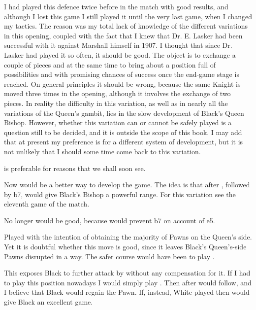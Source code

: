 \documentclass[10pt,twoside]{article}
\begin{document}
I had played this defence twice before in the match with good results, and although I lost this game I still played it until the very last game, when I changed my tactics. The reason was my total lack of knowledge of the different variations in this opening, coupled with the fact that I knew that Dr. E. Lasker had been successful with it against Marshall himself in 1907. I thought that since Dr. Lasker had played it so often, it should be good. The object is to exchange a couple of pieces and at the same time to bring about a position full of possibilities and with promising chances of success once the end-game stage is reached. On general principles it should be wrong, because the same Knight is moved three times in the opening, although it involves the exchange of two pieces. In reality the difficulty in this variation, as well as in nearly all the variations of the Queen's gambit, lies in the slow development of Black's Queen Bishop. However, whether this variation can or cannot be safely played is a question still to be decided, and it is outside the scope of this book. I may add that at present my preference is for a different system of development, but it is not unlikely that I should some time come back to this variation.


 is preferable for reasons that we shall soon see.


Now  would be a better way to develop the game. The idea is that after , followed by \figB b7, would give Black's Bishop a powerful range. For this variation see the eleventh game of the match.


No longer would  be good, because  would prevent \figB b7 on account of \figN e5.


Played with the intention of obtaining the majority of Pawns on the Queen's side. Yet it is doubtful whether this move is good, since it leaves Black's Queen's-side Pawns disrupted in a way. The safer course would have been to play .


\board

This exposes Black to further attack by  without any compensation for it. If I had to play this position nowadays I would simply play . Then after  would follow, and I believe that Black would regain the Pawn. If, instead, White played  then  would give Black an excellent game.
\end{document}
